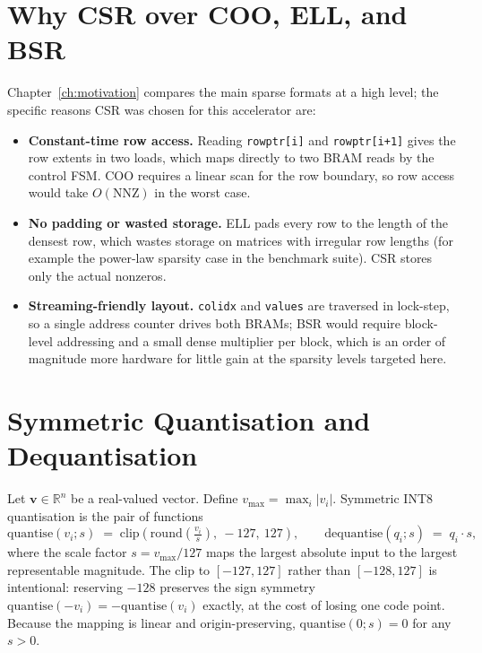 \documentclass[oneside]{ecsproject}    %
\begin{document}
\section{Why CSR over COO, ELL, and BSR}
\label{app:csr-choice}

Chapter~\ref{ch:motivation} compares the main sparse formats at a high level;
the specific reasons CSR was chosen for this accelerator are:
\begin{itemize}
  \item \textbf{Constant-time row access.} Reading \texttt{rowptr[i]} and
        \texttt{rowptr[i+1]} gives the row extents in two loads, which maps
        directly to two BRAM reads by the control FSM. COO requires a linear
        scan for the row boundary, so row access would take $O(\mathrm{NNZ})$
        in the worst case.
  \item \textbf{No padding or wasted storage.} ELL pads every row to the
        length of the densest row, which wastes storage on matrices with
        irregular row lengths (for example the power-law sparsity case in
        the benchmark suite). CSR stores only the actual nonzeros.
  \item \textbf{Streaming-friendly layout.} \texttt{colidx} and
        \texttt{values} are traversed in lock-step, so a single address
        counter drives both BRAMs; BSR would require block-level addressing
        and a small dense multiplier per block, which is an order of
        magnitude more hardware for little gain at the sparsity levels
        targeted here.
\end{itemize}

\section{Symmetric Quantisation and Dequantisation}
\label{app:quant-definition}

Let $\mathbf{v} \in \mathbb{R}^n$ be a real-valued vector. Define
$v_{\max} = \max_i |v_i|$. Symmetric INT8 quantisation is the pair of
functions
\[
  \mathrm{quantise}(v_i; s) \;=\; \mathrm{clip}\!\left(
    \mathrm{round}\!\left(\tfrac{v_i}{s}\right),\ -127,\ 127
  \right),
  \qquad
  \mathrm{dequantise}(q_i; s) \;=\; q_i \cdot s,
\]
where the scale factor $s = v_{\max} / 127$ maps the largest absolute input to
the largest representable magnitude. The clip to $[-127, 127]$ rather than
$[-128, 127]$ is intentional: reserving $-128$ preserves the sign symmetry
$\mathrm{quantise}(-v_i) = -\mathrm{quantise}(v_i)$ exactly, at the cost of
losing one code point. Because the mapping is linear and origin-preserving,
$\mathrm{quantise}(0; s) = 0$ for any $s > 0$.
\end{document}
